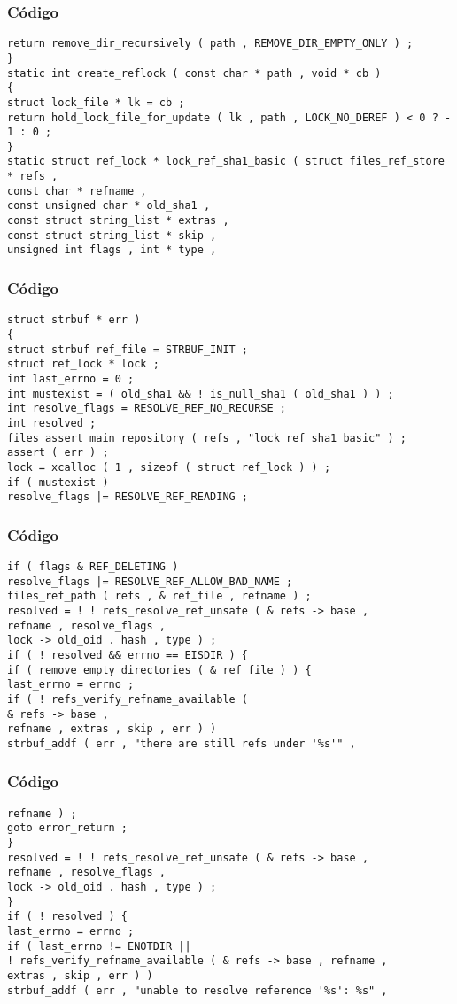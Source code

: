 \documentclass{beamer}
\begin{document}
\begin{frame}[fragile]
\frametitle{C\'odigo}
\begin{verbatim}
return remove_dir_recursively ( path , REMOVE_DIR_EMPTY_ONLY ) ; 
} 
static int create_reflock ( const char * path , void * cb ) 
{ 
struct lock_file * lk = cb ; 
return hold_lock_file_for_update ( lk , path , LOCK_NO_DEREF ) < 0 ? - 1 : 0 ; 
} 
static struct ref_lock * lock_ref_sha1_basic ( struct files_ref_store * refs , 
const char * refname , 
const unsigned char * old_sha1 , 
const struct string_list * extras , 
const struct string_list * skip , 
unsigned int flags , int * type , 
\end{verbatim}
\end{frame}
\begin{frame}[fragile]
\frametitle{C\'odigo}
\begin{verbatim}
struct strbuf * err ) 
{ 
struct strbuf ref_file = STRBUF_INIT ; 
struct ref_lock * lock ; 
int last_errno = 0 ; 
int mustexist = ( old_sha1 && ! is_null_sha1 ( old_sha1 ) ) ; 
int resolve_flags = RESOLVE_REF_NO_RECURSE ; 
int resolved ; 
files_assert_main_repository ( refs , "lock_ref_sha1_basic" ) ; 
assert ( err ) ; 
lock = xcalloc ( 1 , sizeof ( struct ref_lock ) ) ; 
if ( mustexist ) 
resolve_flags |= RESOLVE_REF_READING ; 
\end{verbatim}
\end{frame}
\begin{frame}[fragile]
\frametitle{C\'odigo}
\begin{verbatim}
if ( flags & REF_DELETING ) 
resolve_flags |= RESOLVE_REF_ALLOW_BAD_NAME ; 
files_ref_path ( refs , & ref_file , refname ) ; 
resolved = ! ! refs_resolve_ref_unsafe ( & refs -> base , 
refname , resolve_flags , 
lock -> old_oid . hash , type ) ; 
if ( ! resolved && errno == EISDIR ) { 
if ( remove_empty_directories ( & ref_file ) ) { 
last_errno = errno ; 
if ( ! refs_verify_refname_available ( 
& refs -> base , 
refname , extras , skip , err ) ) 
strbuf_addf ( err , "there are still refs under '%s'" , 
\end{verbatim}
\end{frame}
\begin{frame}[fragile]
\frametitle{C\'odigo}
\begin{verbatim}
refname ) ; 
goto error_return ; 
} 
resolved = ! ! refs_resolve_ref_unsafe ( & refs -> base , 
refname , resolve_flags , 
lock -> old_oid . hash , type ) ; 
} 
if ( ! resolved ) { 
last_errno = errno ; 
if ( last_errno != ENOTDIR || 
! refs_verify_refname_available ( & refs -> base , refname , 
extras , skip , err ) ) 
strbuf_addf ( err , "unable to resolve reference '%s': %s" , 
\end{verbatim}
\end{frame}
\end{document}
